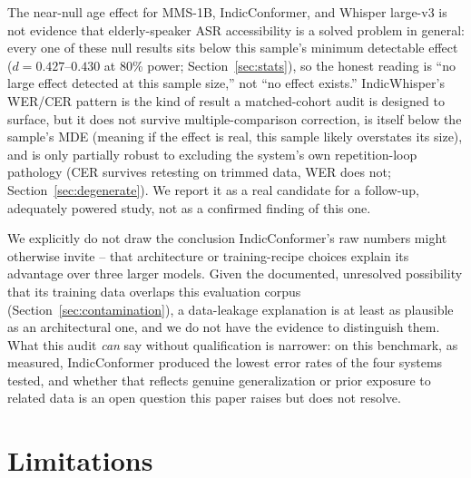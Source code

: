 \documentclass[11pt]{article}
\begin{document}
The near-null age effect for MMS-1B, IndicConformer, and Whisper large-v3 is not evidence that
elderly-speaker ASR accessibility is a solved problem in general: every one of these null results
sits below this sample's minimum detectable effect ($d=0.427$--$0.430$ at 80\% power;
Section~\ref{sec:stats}), so the honest reading is ``no large effect detected at this sample size,''
not ``no effect exists.'' IndicWhisper's WER/CER pattern is the kind of result a matched-cohort
audit is designed to surface, but it does not survive multiple-comparison correction, is itself
below the sample's MDE (meaning if the effect is real, this sample likely overstates its size), and
is only partially robust to excluding the system's own repetition-loop pathology (CER survives
retesting on trimmed data, WER does not; Section~\ref{sec:degenerate}). We report it as a real
candidate for a follow-up, adequately powered study, not as a confirmed finding of this one.

We explicitly do not draw the conclusion IndicConformer's raw numbers might otherwise invite --
that architecture or training-recipe choices explain its advantage over three larger models. Given
the documented, unresolved possibility that its training data overlaps this evaluation corpus
(Section~\ref{sec:contamination}), a data-leakage explanation is at least as plausible as an
architectural one, and we do not have the evidence to distinguish them. What this audit \emph{can}
say without qualification is narrower: on this benchmark, as measured, IndicConformer produced the
lowest error rates of the four systems tested, and whether that reflects genuine generalization or
prior exposure to related data is an open question this paper raises but does not resolve.

\section{Limitations}
\label{sec:limitations}
\end{document}

